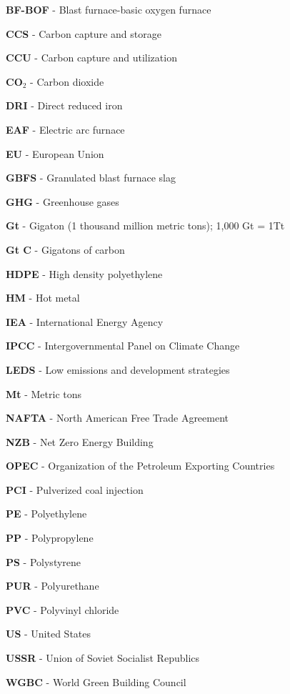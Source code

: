 \begin{scriptsize}
  \begin{myitemize}
  \item[] \textbf{BF-BOF} - Blast furnace-basic oxygen furnace
  \item[] \textbf{CCS} - Carbon capture and storage
  \item[] \textbf{CCU} - Carbon capture and utilization
  \item[] \textbf{CO$_2$} - Carbon dioxide
  \item[] \textbf{DRI} - Direct reduced iron
  \item[] \textbf{EAF} - Electric arc furnace
  \item[] \textbf{EU} - European Union
  \item[] \textbf{GBFS} - Granulated blast furnace slag
  \item[] \textbf{GHG} - Greenhouse gases
  \item[] \textbf{Gt} - Gigaton (1 thousand million metric tons); 1,000 Gt = 1Tt
  \item[] \textbf{Gt C} - Gigatons of carbon
  \item[] \textbf{HDPE} - High density polyethylene
  \item[] \textbf{HM} - Hot metal
  \item[] \textbf{IEA} - International Energy Agency
  \item[] \textbf{IPCC} - Intergovernmental Panel on Climate Change
  \item[] \textbf{LEDS} - Low emissions and development strategies
  \item[] \textbf{Mt} - Metric tons
  \item[] \textbf{NAFTA} - North American Free Trade Agreement
  \item[] \textbf{NZB} - Net Zero Energy Building
  \item[] \textbf{OPEC} - Organization of the Petroleum Exporting Countries
  \item[] \textbf{PCI} - Pulverized coal injection
  \item[] \textbf{PE} - Polyethylene
  \item[] \textbf{PP} - Polypropylene
  \item[] \textbf{PS} - Polystyrene
  \item[] \textbf{PUR} - Polyurethane
  \item[] \textbf{PVC} - Polyvinyl chloride
  \item[] \textbf{US} - United States
  \item[] \textbf{USSR} - Union of Soviet Socialist Republics
  \item[] \textbf{WGBC} - World Green Building Council
  \end{myitemize}
\end{scriptsize}

